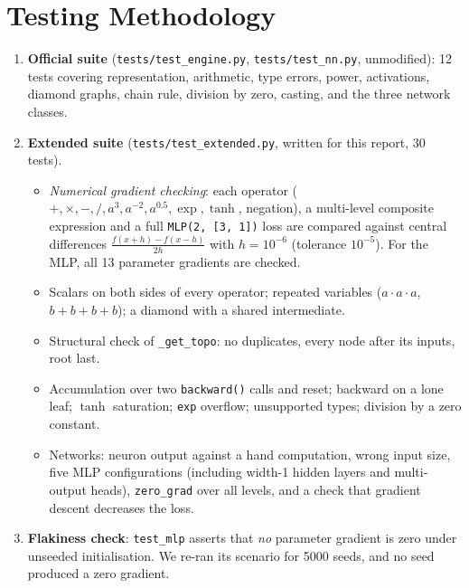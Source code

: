 \documentclass[11pt,a4paper]{article}
\begin{document}
\section{Testing Methodology}
\begin{enumerate}
  \item \textbf{Official suite} (\texttt{tests/test\_engine.py}, \texttt{tests/test\_nn.py}, unmodified):
        12 tests covering representation, arithmetic, type errors, power, activations, diamond graphs,
        chain rule, division by zero, casting, and the three network classes.
  \item \textbf{Extended suite} (\texttt{tests/test\_extended.py}, written for this report, 30 tests).
        \begin{itemize}
          \item \emph{Numerical gradient checking}: each operator ($+,\times,-,/,a^3,a^{-2},a^{0.5},\exp,\tanh$, negation),
                a multi-level composite expression and a full \texttt{MLP(2, [3, 1])} loss are compared against central
                differences $\frac{f(x+h)-f(x-h)}{2h}$ with $h=10^{-6}$ (tolerance $10^{-5}$). For the MLP, all 13 parameter gradients are checked.
          \item Scalars on both sides of every operator; repeated variables ($a\cdot a\cdot a$, $b+b+b+b$); a diamond with a shared intermediate.
          \item Structural check of \texttt{\_get\_topo}: no duplicates, every node after its inputs, root last.
          \item Accumulation over two \texttt{backward()} calls and reset; backward on a lone leaf; $\tanh$ saturation; \texttt{exp} overflow;
                unsupported types; division by a zero constant.
          \item Networks: neuron output against a hand computation, wrong input size, five MLP configurations
                (including width-1 hidden layers and multi-output heads), \texttt{zero\_grad} over all levels,
                and a check that gradient descent decreases the loss.
        \end{itemize}
  \item \textbf{Flakiness check}: \texttt{test\_mlp} asserts that \emph{no} parameter gradient is zero under
        unseeded initialisation. We re-ran its scenario for 5000 seeds, and no seed produced a zero gradient.
\end{enumerate}
\end{document}
